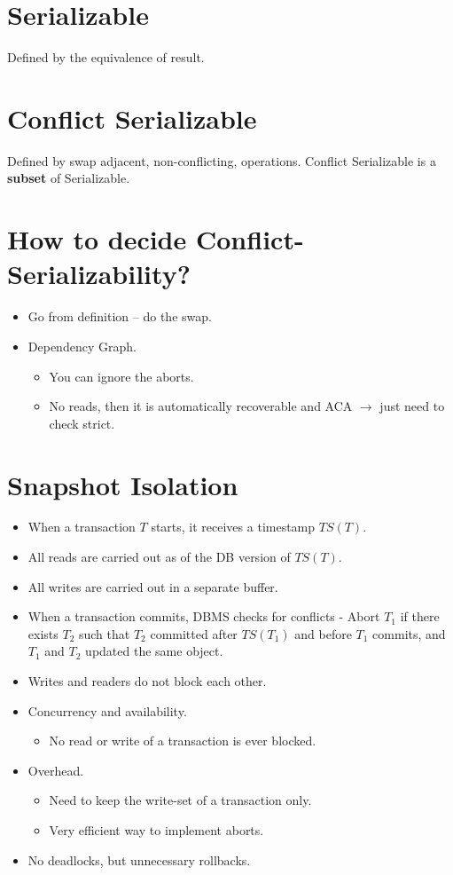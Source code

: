 \documentclass{article}
\begin{document}
\section*{Serializable}
Defined by the equivalence of result.

\section*{Conflict Serializable}
Defined by swap adjacent, non-conflicting, operations. Conflict Serializable is a \textbf{subset} of Serializable.

\section*{How to decide Conflict-Serializability?}
\begin{itemize}
    \item Go from definition -- do the swap.
    \item Dependency Graph.
          \begin{itemize}
              \item You can ignore the aborts.
              \item No reads, then it is automatically recoverable and ACA $\rightarrow$ just need
                    to check strict.
          \end{itemize}
\end{itemize}

\section*{Snapshot Isolation}
\begin{itemize}
    \item When a transaction $T$ starts, it receives a timestamp $TS(T)$.
    \item All reads are carried out as of the DB version of $TS(T)$.
    \item All writes are carried out in a separate buffer.
    \item When a transaction commits, DBMS checks for conflicts - Abort $T_1$ if there
          exists $T_2$ such that $T_2$ committed after $TS(T_1)$ and before $T_1$
          commits, and $T_1$ and $T_2$ updated the same object.
    \item Writes and readers do not block each other.
    \item Concurrency and availability.
          \begin{itemize}
              \item No read or write of a transaction is ever blocked.
          \end{itemize}
    \item Overhead.
          \begin{itemize}
              \item Need to keep the write-set of a transaction only.
              \item Very efficient way to implement aborts.
          \end{itemize}
    \item No deadlocks, but unnecessary rollbacks.
\end{itemize}
\end{document}

